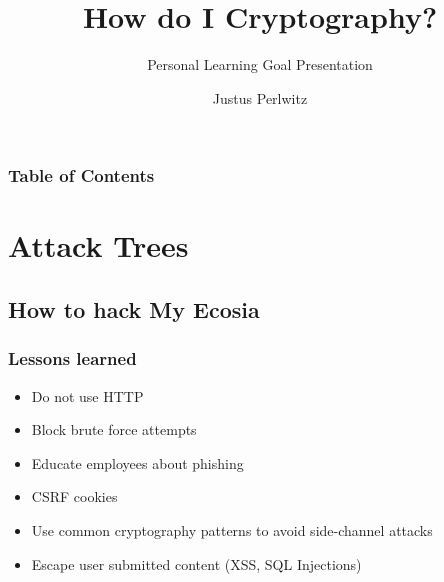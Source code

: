 \documentclass{beamer}
\title{How do I Cryptography?}
\subtitle{Personal Learning Goal Presentation}
\author{Justus Perlwitz}
\begin{document}
  \begin{frame}
    {\titlepage}
  \end{frame}
  \begin{frame}
    \frametitle{Table of Contents}
    \tableofcontents[]
  \end{frame}
  \section{Attack Trees}
    \subsection{How to hack My Ecosia}
      \begin{frame}
        \frametitle{\insertsubsection}
      \end{frame}
      \begin{frame}
        \frametitle{Lessons learned}
        \begin{itemize}
          \item Do not use HTTP
          \item Block brute force attempts
          \item Educate employees about phishing
          \item CSRF cookies
          \item Use common cryptography patterns to avoid side-channel attacks
          \item Escape user submitted content (XSS, SQL Injections)
        \end{itemize}
      \end{frame}
\end{document}

